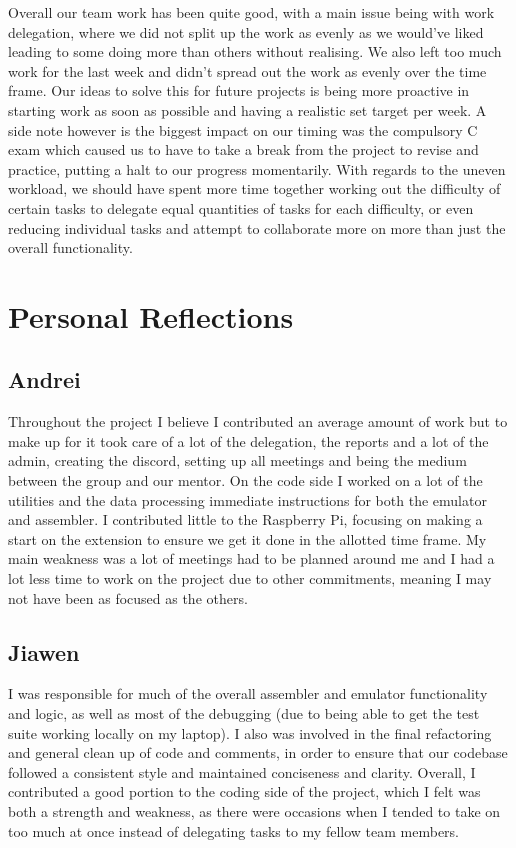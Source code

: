 \documentclass{article}
\begin{document}
Overall our team work has been quite good, with a main issue being with work delegation, where we did not split up the work as evenly as we would've liked leading to some doing more than others without realising. We also left too much work for the last week and didn't spread out the work as evenly over the time frame. Our ideas to solve this for future projects is being more proactive in starting work as soon as possible and having a realistic set target per week. A side note however is the biggest impact on our timing was the compulsory C exam which caused us to have to take a break from the project to revise and practice, putting a halt to our progress momentarily. With regards to the uneven workload, we should have spent more time together working out the difficulty of certain tasks to delegate equal quantities of tasks for each difficulty, or even reducing individual tasks and attempt to collaborate more on more than just the overall functionality.

\section{Personal Reflections}

\subsection{Andrei}

Throughout the project I believe I contributed an average amount of work but to make up for it took care of a lot of the delegation, the reports and a lot of the admin, creating the discord, setting up all meetings and being the medium between the group and our mentor. On the code side I worked on a lot of the utilities and the data processing immediate instructions for both the emulator and assembler. I contributed little to the Raspberry Pi, focusing on making a start on the extension to ensure we get it done in the allotted time frame. My main weakness was a lot of meetings had to be planned around me and I had a lot less time to work on the project due to other commitments, meaning I may not have been as focused as the others.

\subsection{Jiawen}

I was responsible for much of the overall assembler and emulator functionality and logic, as well as most of the debugging (due to being able to get the test suite working locally on my laptop). I also was involved in the final refactoring and general clean up of code and comments, in order to ensure that our codebase followed a consistent style and maintained conciseness and clarity.
Overall, I contributed a good portion to the coding side of the project, which I felt was both a strength and weakness, as there were occasions when I tended to take on too much at once instead of delegating tasks to my fellow team members.
\end{document}
